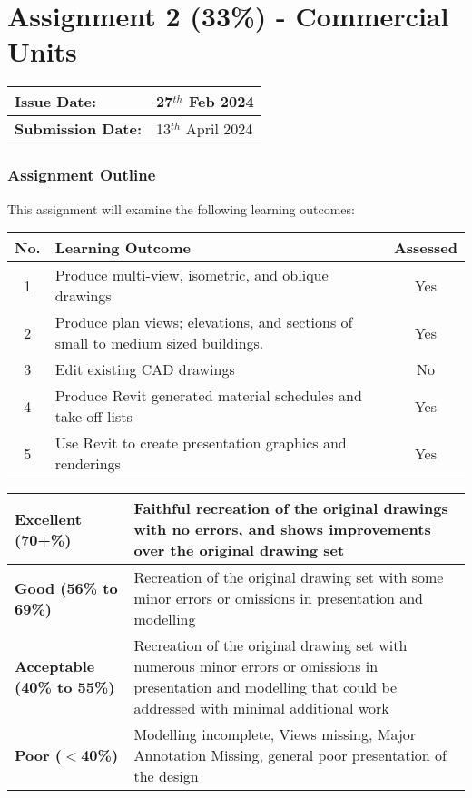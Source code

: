 
	
\part*{Assignment 2 (33\%) - Commercial Units}

\begin{tabularx}{\textwidth}{ |X|X| }
	\hline
	\textbf{Issue Date:} & 27$^{th}$ Feb 2024\\
	\hline 
	\textbf{Submission Date:}  & 13$^{th}$ April 2024  \\
	\hline
\end{tabularx}

\section*{Assignment Outline}

This assignment will examine the following learning outcomes:

\begin{tabularx}{\textwidth}{ |c|X|c| }
	\hline
	\textbf{No.} & \textbf{Learning Outcome} & \textbf{Assessed} \\
	\hline 
	1  & Produce multi-view, isometric, and oblique drawings & Yes \\
	2  & Produce plan views; elevations, and sections of small to medium sized buildings. & Yes \\
	3  & Edit existing CAD drawings & No \\
	4  & Produce Revit generated material schedules and take-off lists & Yes \\
	5  & Use Revit to create presentation graphics and renderings & Yes \\
	\hline
\end{tabularx}

\vspace{1cm}

\begin{tabularx}{\textwidth}{ |l|X| }
	\hline 
	\textbf{Excellent (70+\%)} & Faithful recreation of the original drawings with no errors, and shows improvements over the original drawing set\\ 
	\hline
	\textbf{Good (56\% to 69\%)} & Recreation of the original drawing set with some minor errors or omissions in presentation and modelling \\
	\hline
	\textbf{Acceptable (40\% to 55\%)} & Recreation of the original drawing set with numerous minor errors or omissions in presentation and modelling that could be addressed with minimal additional work \\ 
	\hline
	\textbf{Poor ($<$40\%)} & Modelling incomplete, Views missing, Major Annotation Missing, general poor presentation of the design  \\
	\hline
\end{tabularx}

